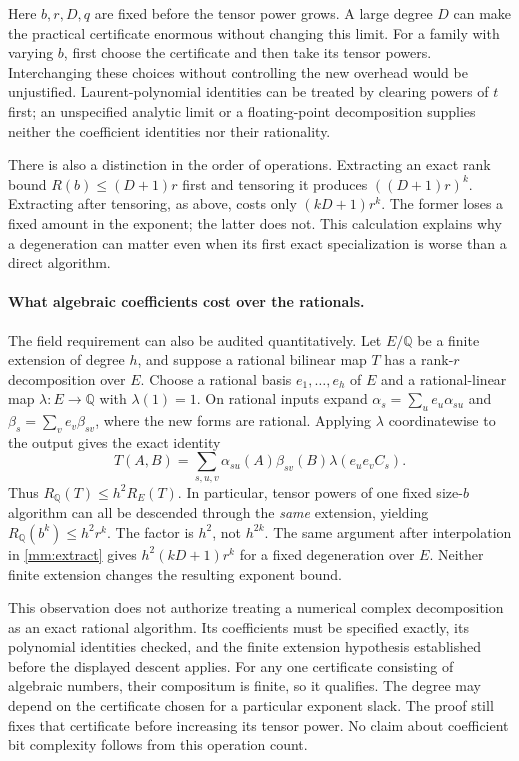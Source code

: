 \documentclass[11pt]{article}
\begin{document}
Here $b,r,D,q$ are fixed before the tensor power grows. A large degree
$D$ can make the practical certificate enormous without changing this
limit. For a family with varying $b$, first choose the certificate and
then take its tensor powers. Interchanging these choices without
controlling the new overhead would be unjustified. Laurent-polynomial
identities can be treated by clearing powers of $t$ first; an unspecified
analytic limit or a floating-point decomposition supplies neither the
coefficient identities nor their rationality.

There is also a distinction in the order of operations. Extracting an
exact rank bound $R(b)\le(D+1)r$ first and tensoring it produces
$((D+1)r)^k$. Extracting after tensoring, as above, costs only
$(kD+1)r^k$. The former loses a fixed amount in the exponent; the latter
does not. This calculation explains why a degeneration can matter even
when its first exact specialization is worse than a direct algorithm.

\paragraph{What algebraic coefficients cost over the rationals.}
The field requirement can also be audited quantitatively. Let
$E/\mathbb Q$ be a finite extension of degree $h$, and suppose a
rational bilinear map $T$ has a rank-$r$ decomposition over $E$.
Choose a rational basis $e_1,\ldots,e_h$ of $E$ and a rational-linear
map $\lambda:E\to\mathbb Q$ with $\lambda(1)=1$.
On rational inputs expand
$\alpha_s=\sum_u e_u\alpha_{su}$ and
$\beta_s=\sum_v e_v\beta_{sv}$, where the new forms are rational.
Applying $\lambda$ coordinatewise to the output gives the exact identity
\[
 T(A,B)=\sum_{s,u,v}\alpha_{su}(A)\beta_{sv}(B)
                          \lambda(e_ue_v C_s).
\]
Thus $R_{\mathbb Q}(T)\le h^2R_E(T)$. In particular, tensor powers
of one fixed size-$b$ algorithm can all be descended through the
\emph{same} extension, yielding $R_{\mathbb Q}(b^k)\le h^2r^k$.
The factor is $h^2$, not $h^{2k}$. The same argument after interpolation
in \eqref{mm:extract} gives $h^2(kD+1)r^k$ for a fixed degeneration
over $E$. Neither finite extension changes the resulting exponent bound.

This observation does not authorize treating a numerical complex
decomposition as an exact rational algorithm. Its coefficients must be
specified exactly, its polynomial identities checked, and the finite
extension hypothesis established before the displayed descent applies.
For any one certificate consisting of algebraic numbers, their
compositum is finite, so it qualifies. The degree may depend on the
certificate chosen for a particular exponent slack. The proof still
fixes that certificate before increasing its tensor power. No claim
about coefficient bit complexity follows from this operation count.
\end{document}
